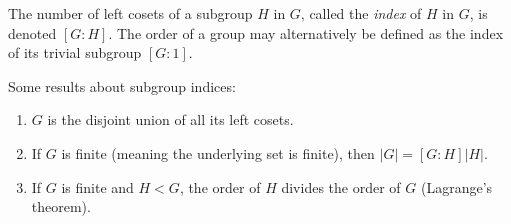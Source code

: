 \begin{defn}
The number of left cosets of a subgroup $H$ in $G$, called the \emph{index} of
$H$ in $G$, is denoted $[G:H]$. The order of a group may alternatively
be defined as the index of its trivial subgroup $[G : 1]$.
\end{defn}

\begin{corol}
Some results about subgroup indices:
\begin{enumerate}
  \item{$G$ is the disjoint union of all its left cosets.}
  \item{If $G$ is finite (meaning the underlying set is finite), then
        $|G| = [G:H] |H|$.}
  \item{If $G$ is finite and $H < G$, the order of $H$ divides the
        order of $G$ (Lagrange's theorem).}
\end{enumerate}
\end{corol}

